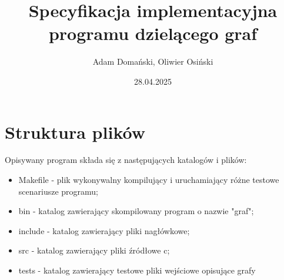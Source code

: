 \documentclass{article}
\title{\textbf{Specyfikacja implementacyjna programu dzielącego graf}}
\author{Adam Domański, Oliwier Osiński}
\date{28.04.2025}
\begin{document}
\maketitle

\section*{Struktura plików}
Opisywany program składa się z następujących katalogów i plików:
\begin{itemize}
    \item Makefile - plik wykonywalny kompilujący i uruchamiający różne testowe scenariusze programu;
    \item bin - katalog zawierający skompilowany program o nazwie "graf";
    \item include - katalog zawierający pliki nagłówkowe;
    \item src - katalog zawierający pliki źródłowe c;
    \item tests - katalog zawierający testowe pliki wejściowe opisujące grafy
\end{itemize}
\end{document}
